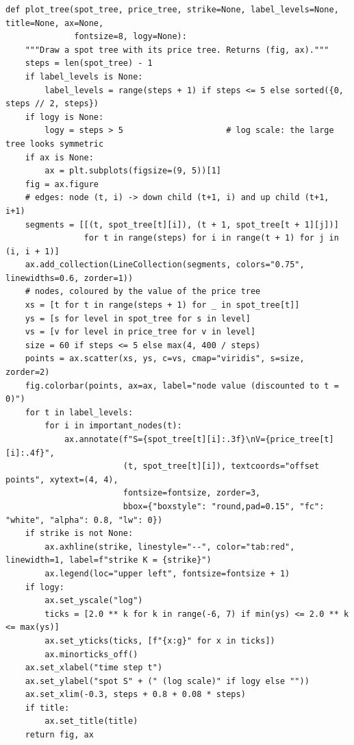 \documentclass[11pt,a4paper]{article}
\begin{document}
\begin{minipage}{\linewidth}
\begin{lstlisting}[style=pysmall,title={new code (\texttt{tree\_plot.py})}]
def plot_tree(spot_tree, price_tree, strike=None, label_levels=None, title=None, ax=None,
              fontsize=8, logy=None):
    """Draw a spot tree with its price tree. Returns (fig, ax)."""
    steps = len(spot_tree) - 1
    if label_levels is None:
        label_levels = range(steps + 1) if steps <= 5 else sorted({0, steps // 2, steps})
    if logy is None:
        logy = steps > 5                     # log scale: the large tree looks symmetric
    if ax is None:
        ax = plt.subplots(figsize=(9, 5))[1]
    fig = ax.figure
    # edges: node (t, i) -> down child (t+1, i) and up child (t+1, i+1)
    segments = [[(t, spot_tree[t][i]), (t + 1, spot_tree[t + 1][j])]
                for t in range(steps) for i in range(t + 1) for j in (i, i + 1)]
    ax.add_collection(LineCollection(segments, colors="0.75", linewidths=0.6, zorder=1))
    # nodes, coloured by the value of the price tree
    xs = [t for t in range(steps + 1) for _ in spot_tree[t]]
    ys = [s for level in spot_tree for s in level]
    vs = [v for level in price_tree for v in level]
    size = 60 if steps <= 5 else max(4, 400 / steps)
    points = ax.scatter(xs, ys, c=vs, cmap="viridis", s=size, zorder=2)
    fig.colorbar(points, ax=ax, label="node value (discounted to t = 0)")
    for t in label_levels:
        for i in important_nodes(t):
            ax.annotate(f"S={spot_tree[t][i]:.3f}\nV={price_tree[t][i]:.4f}",
                        (t, spot_tree[t][i]), textcoords="offset points", xytext=(4, 4),
                        fontsize=fontsize, zorder=3,
                        bbox={"boxstyle": "round,pad=0.15", "fc": "white", "alpha": 0.8, "lw": 0})
    if strike is not None:
        ax.axhline(strike, linestyle="--", color="tab:red", linewidth=1, label=f"strike K = {strike}")
        ax.legend(loc="upper left", fontsize=fontsize + 1)
    if logy:
        ax.set_yscale("log")
        ticks = [2.0 ** k for k in range(-6, 7) if min(ys) <= 2.0 ** k <= max(ys)]
        ax.set_yticks(ticks, [f"{x:g}" for x in ticks])
        ax.minorticks_off()
    ax.set_xlabel("time step t")
    ax.set_ylabel("spot S" + (" (log scale)" if logy else ""))
    ax.set_xlim(-0.3, steps + 0.8 + 0.08 * steps)
    if title:
        ax.set_title(title)
    return fig, ax
\end{lstlisting}\end{minipage}\par\smallskip
\end{document}

